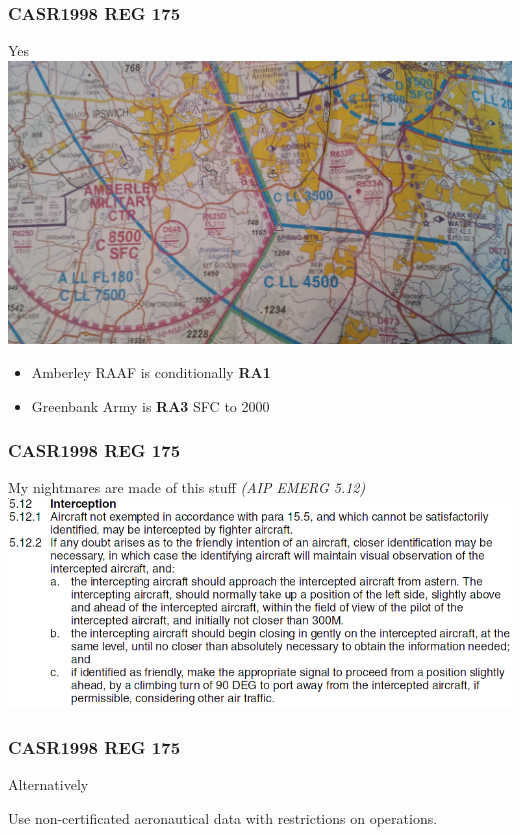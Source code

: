 \begin{frame}
\frametitle{CASR1998 REG 175}
\begin{block}{Yes}
\includegraphics[height=0.5\textheight]{image/vtc-amberley-greenbank.jpg}
\begin{itemize}
\item \tiny{Amberley RAAF is conditionally \textbf{RA1}}
\item \tiny{Greenbank Army is \textbf{RA3} SFC to 2000}
\end{itemize}
\end{block}
\end{frame}

\begin{frame}
\frametitle{CASR1998 REG 175}
\begin{block}{My nightmares are made of this stuff \tiny{\emph{(AIP EMERG 5.12)}}}
\includegraphics[height=0.5\textheight]{image/ersa-interception.png}
\end{block}
\end{frame}

\begin{frame}
\frametitle{CASR1998 REG 175}
\begin{block}{Alternatively}
\begin{center}
Use non-certificated aeronautical data with restrictions on operations.
\end{center}
\end{block}
\end{frame}


